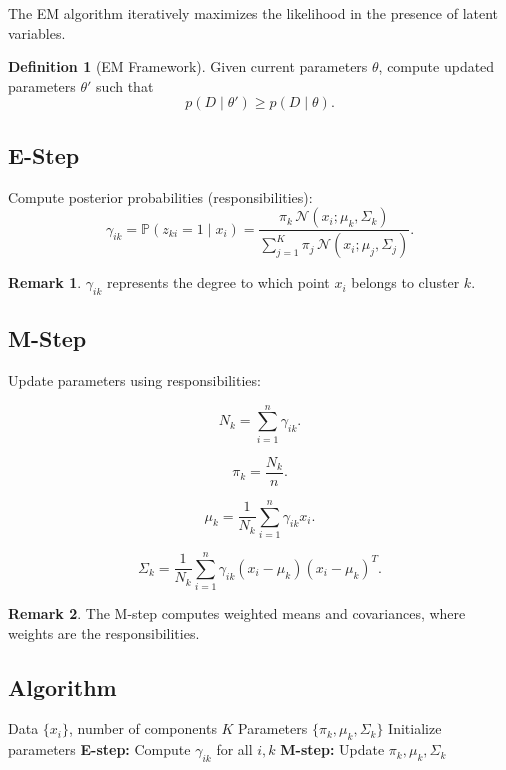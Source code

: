 \documentclass[12pt,oneside]{book}
\numberwithin{equation}{section}
\theoremstyle{definition}
\newtheorem{definition}{Definition}[section]
\newtheorem{remark}{Remark}[section]
\theoremstyle{plain}
\theoremstyle{remark}
\newcommand{\Prob}{\mathbb{P}}
\begin{document}
The EM algorithm iteratively maximizes the likelihood in the presence of latent variables.

\begin{definition}[EM Framework]
Given current parameters $\theta$, compute updated parameters $\theta'$ such that
\[
p(D \mid \theta') \ge p(D \mid \theta).
\]
\end{definition}

\subsection{E-Step}

Compute posterior probabilities (responsibilities):
\[
\gamma_{ik}
=
\Prob(z_{ki}=1 \mid x_i)
=
\frac{\pi_k \, \mathcal{N}(x_i;\mu_k,\Sigma_k)}
{\sum_{j=1}^K \pi_j \, \mathcal{N}(x_i;\mu_j,\Sigma_j)}.
\]

\begin{remark}
$\gamma_{ik}$ represents the degree to which point $x_i$ belongs to cluster $k$.
\end{remark}

\subsection{M-Step}

Update parameters using responsibilities:

\[
N_k = \sum_{i=1}^n \gamma_{ik}.
\]

\[
\pi_k = \frac{N_k}{n}.
\]

\[
\mu_k = \frac{1}{N_k} \sum_{i=1}^n \gamma_{ik} x_i.
\]

\[
\Sigma_k = \frac{1}{N_k}
\sum_{i=1}^n
\gamma_{ik}
(x_i-\mu_k)(x_i-\mu_k)^T.
\]

\begin{remark}
The M-step computes weighted means and covariances, where weights are the responsibilities.
\end{remark}

\subsection{Algorithm}

\begin{algorithm}[H]
\caption{Gaussian Mixture Model via EM}
\begin{algorithmic}[1]
\Require Data $\{x_i\}$, number of components $K$
\Ensure Parameters $\{\pi_k,\mu_k,\Sigma_k\}$
\State Initialize parameters
\Repeat
    \State \textbf{E-step:} Compute $\gamma_{ik}$ for all $i,k$
    \State \textbf{M-step:} Update $\pi_k,\mu_k,\Sigma_k$
\end{algorithmic}
\end{algorithm}
\end{document}
